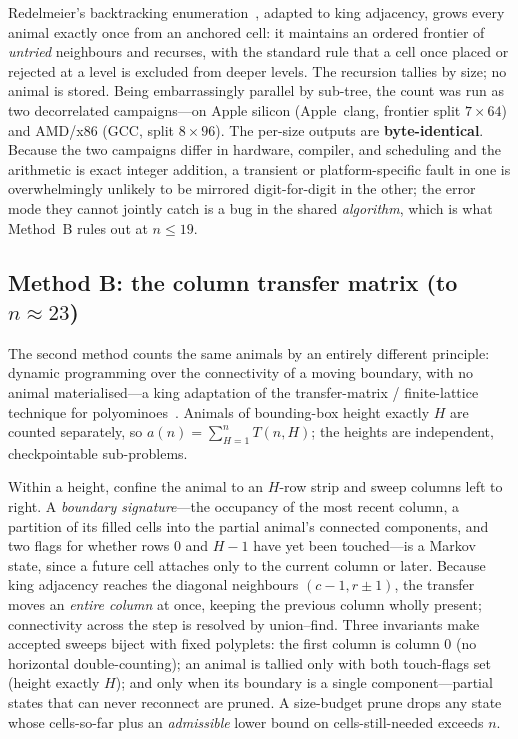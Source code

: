 \documentclass[11pt]{article}
\begin{document}
Redelmeier's backtracking enumeration~\cite{redelmeier}, adapted to king
adjacency, grows every animal exactly once from an anchored cell: it maintains
an ordered frontier of \emph{untried} neighbours and recurses, with the
standard rule that a cell once placed or rejected at a level is excluded from
deeper levels. The recursion tallies by size; no animal is stored. Being
embarrassingly parallel by sub-tree, the count was run as two decorrelated
campaigns---on Apple silicon (Apple~clang, frontier split $7\times64$) and
AMD/x86 (GCC, split $8\times96$). The per-size outputs are
\textbf{byte-identical}. Because the two campaigns differ in hardware,
compiler, and scheduling and the arithmetic is exact integer addition, a
transient or platform-specific fault in one is overwhelmingly unlikely to be
mirrored digit-for-digit in the other; the error mode they cannot jointly
catch is a bug in the shared \emph{algorithm}, which is what Method~B rules
out at $n\le19$.

\subsection{Method B: the column transfer matrix (to $n\approx23$)}
\label{sec:methodB}

The second method counts the same animals by an entirely different principle:
dynamic programming over the connectivity of a moving boundary, with no animal
materialised---a king adaptation of the transfer-matrix / finite-lattice
technique for polyominoes~\cite{jensen2001,jensen2003,bousquet}. Animals of
bounding-box height exactly $H$ are counted separately, so
$a(n)=\sum_{H=1}^{n}T(n,H)$; the heights are independent, checkpointable
sub-problems.

Within a height, confine the animal to an $H$-row strip and sweep columns left
to right. A \emph{boundary signature}---the occupancy of the most recent
column, a partition of its filled cells into the partial animal's connected
components, and two flags for whether rows $0$ and $H-1$ have yet been
touched---is a Markov state, since a future cell attaches only to the current
column or later. Because king adjacency reaches the diagonal neighbours
$(c{-}1,r{\pm}1)$, the transfer moves an \emph{entire column} at once, keeping
the previous column wholly present; connectivity across the step is resolved
by union--find. Three invariants make accepted sweeps biject with fixed
polyplets: the first column is column $0$ (no horizontal double-counting); an
animal is tallied only with both touch-flags set (height exactly $H$); and
only when its boundary is a single component---partial states that can never
reconnect are pruned. A size-budget prune drops any state whose cells-so-far
plus an \emph{admissible} lower bound on cells-still-needed exceeds $n$.
\end{document}
